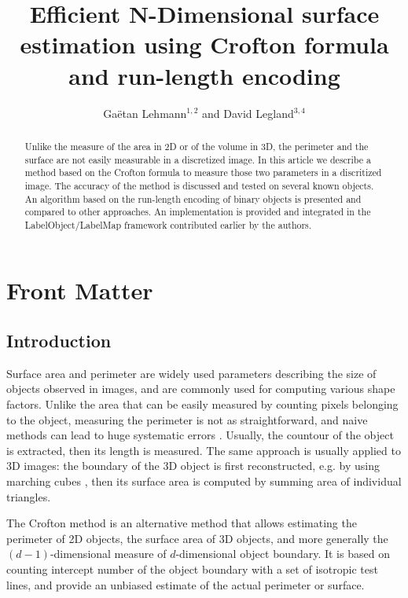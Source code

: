\documentclass{InsightArticle}
\title{Efficient N-Dimensional surface estimation using Crofton formula and run-length encoding}
\author{Ga\"etan Lehmann$^{1,2}$ {\small{and}} David Legland$^{3,4}$}
\begin{document}
\maketitle

\ifhtml
\chapter*{Front Matter\label{front}}
\fi


\begin{abstract}
\noindent
Unlike the measure of the area in 2D or of the volume in 3D, the perimeter and the surface are not easily measurable in a discretized image.
In this article we describe a method based on the Crofton formula to measure those two parameters in a discritized image. The accuracy of
the method is discussed and tested on several known objects. An algorithm based on the run-length encoding of binary objects is presented
and compared to other approaches.
An implementation is provided and integrated in the LabelObject/LabelMap framework contributed earlier by the authors.
\end{abstract}

\tableofcontents

\section{Introduction}

Surface area and perimeter are widely used parameters describing the size of objects observed in images, 
and are commonly used for computing various shape factors.
Unlike the area that can be easily measured by counting pixels belonging to the object, measuring the 
perimeter is not as straightforward, 
and naive methods can lead to huge systematic errors \cite{Klette2004, Legland2007}.
Usually, the countour of the object is extracted, then its length is measured.
The same approach is usually applied to 3D images: the boundary of the 3D object is first reconstructed,
e.g. by using marching cubes \cite{Lorensen1987}, then its surface area is computed by summing 
area of individual triangles.

The Crofton method is an alternative method that allows estimating the perimeter of 2D objects,
the surface area of 3D objects, and more generally the $(d-1)$-dimensional measure of $d$-dimensional 
object boundary. 
It is based on counting intercept number of the object boundary with a set of isotropic test lines, 
and provide an unbiased estimate of the actual perimeter or surface.
\end{document}
